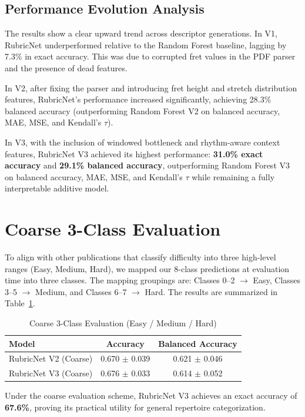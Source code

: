 \subsection{Performance Evolution Analysis}
The results show a clear upward trend across descriptor generations. 
In V1, RubricNet underperformed relative to the Random Forest baseline, lagging by 7.3\% in exact accuracy. This was due to corrupted fret values in the PDF parser and the presence of dead features.

In V2, after fixing the parser and introducing fret height and stretch distribution features, RubricNet's performance increased significantly, achieving 28.3\% balanced accuracy (outperforming Random Forest V2 on balanced accuracy, MAE, MSE, and Kendall's $\tau$).

In V3, with the inclusion of windowed bottleneck and rhythm-aware context features, RubricNet V3 achieved its highest performance: \textbf{31.0\% exact accuracy} and \textbf{29.1\% balanced accuracy}, outperforming Random Forest V3 on balanced accuracy, MAE, MSE, and Kendall's $\tau$ while remaining a fully interpretable additive model.

\section{Coarse 3-Class Evaluation}
To align with other publications that classify difficulty into three high-level ranges (Easy, Medium, Hard), we mapped our 8-class predictions at evaluation time into three classes. The mapping groupings are: Classes 0–2 $\to$ Easy, Classes 3–5 $\to$ Medium, and Classes 6–7 $\to$ Hard. The results are summarized in Table~\ref{tab:3class_results}.

\begin{table}[h]
\centering
\caption{Coarse 3-Class Evaluation (Easy / Medium / Hard)}
\label{tab:3class_results}
\begin{tabular}{lcc}
\toprule
\textbf{Model} & \textbf{Accuracy} & \textbf{Balanced Accuracy} \\
\midrule
RubricNet V2 (Coarse) & 0.670 $\pm$ 0.039 & 0.621 $\pm$ 0.046 \\
RubricNet V3 (Coarse) & 0.676 $\pm$ 0.033 & 0.614 $\pm$ 0.052 \\
\bottomrule
\end{tabular}
\end{table}

Under the coarse evaluation scheme, RubricNet V3 achieves an exact accuracy of \textbf{67.6\%}, proving its practical utility for general repertoire categorization.

